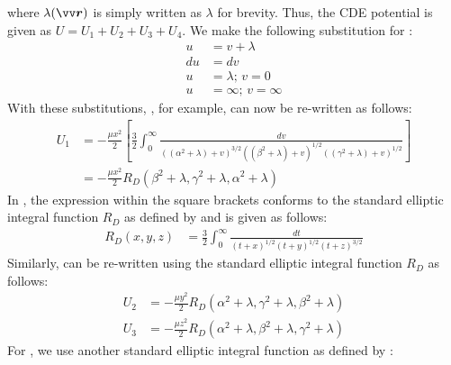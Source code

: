 where $\lambda{(\bvector{r})}$ is simply written as $\lambda$ for brevity. Thus, the \gls{CDE} potential is given as $U = U_1 + U_2 + U_3 + U_4$. We make the following substitution for :
\begin{align}
    u &= v + \lambda
    \label{eqn:ellipsoidal_potential_substitution_1} \\
    du &= dv
    \label{eqn:ellipsoidal_potential_substitution_2} \\
    u &= \lambda \text{; } v = 0
    \label{eqn:ellipsoidal_potential_substitution_3} \\
    u &= \infty \text{; } v = \infty
    \label{eqn:ellipsoidal_potential_substitution_4}
\end{align}
With these substitutions, , for example, can now be re-written as follows:
\begin{align}
    U_1 &= -\frac{\mu x^2}{2} \left[\frac{3}{2} \int_{0}^{\infty} \frac{dv}{((\alpha^2 + \lambda) + v)^{3/2}((\beta^2 + \lambda) + v)^{1/2}((\gamma^2 + \lambda) + v)^{1/2}}\right]
    \label{eqn:ellipsoid_potential_split_1_mod} \\
    &= -\frac{\mu x^2}{2} R_D(\beta^2 + \lambda, \gamma^2 + \lambda, \alpha^2 + \lambda)
    \label{eqn:ellipsoid_potential_split_1_carlson}
\end{align}
In , the expression within the square brackets conforms to the standard elliptic integral function $R_D$ as defined by \cite{carlsonEllipticIntegral} and is given as follows:
\begin{align}
    R_D(x, y, z) &= \frac{3}{2} \int_0^{\infty} \frac{dt}{(t+x)^{1/2}(t+y)^{1/2}(t+z)^{3/2}}
    \label{eqn:carlson_RD}
\end{align}
Similarly,  can be re-written using the standard elliptic integral function $R_D$ as follows:
\begin{align}
    U_2 &= -\frac{\mu y^2}{2} R_D(\alpha^2 + \lambda, \gamma^2 + \lambda, \beta^2 + \lambda)
    \label{eqn:ellipsoid_potential_split_2_carlson} \\
    U_3 &= -\frac{\mu z^2}{2} R_D(\alpha^2 + \lambda, \beta^2 + \lambda, \gamma^2 + \lambda)
    \label{eqn:ellipsoid_potential_split_3_carlson}
\end{align}
For , we use another standard elliptic integral function as defined by \cite{carlsonEllipticIntegral}:

